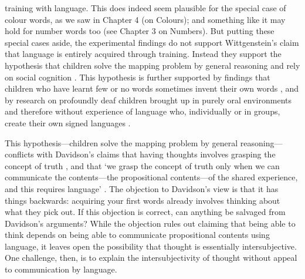 \documentclass[12pt,\papersize]{extarticle}
\begin{document}
training with language.
This does indeed seem plausible for the special case of colour words, as we saw in Chapter 4 (on Colours); 
and something like it may hold for number words too (see Chapter 3 on Numbers).  
But putting these special cases aside, the experimental findings do not support Wittgenstein's claim that language is entirely acquired through training.
Instead they support the hypothesis that children solve the mapping problem by general reasoning and rely on social cognition
\citep{Baldwin:1995xl,Bloom:2000qz,Sabbagh:2001sp}. 
This hypothesis is further supported by findings that children who have learnt few or no words sometimes invent their own words \citep{Clark:1993bv}, 
and by
research on profoundly deaf children brought up in purely oral environments and therefore without experience of language who, individually or in groups, create their own signed languages \citep{Kegl:1999es,Senghas:2001zm,Goldin-Meadow:2003pj}. 

This hypothesis---children solve the mapping problem by general reasoning---conflicts with Davidson's claims that having thoughts involves grasping the concept of truth \citep[p.\ 189]{Davidson:2001sm}, 
and that `we grasp the concept of truth only when we can communicate the contents—the propositional contents—of the shared experience, and this requires language' \citep[p.\ 27]{Davidson:1997wj}.
%
The objection to Davidson's view is that  it has things backwards: acquiring your first words already involves thinking about what they pick out. 
If this objection is correct, can anything be salvaged from Davidson's arguments? 
While the objection rules out claiming that being able to think depends on being able to communicate propositional contents using language, it leaves open the possibility that thought is essentially intersubjective.
One challenge, then, is to explain the intersubjectivity of thought without appeal to communication by language.
\end{document}
